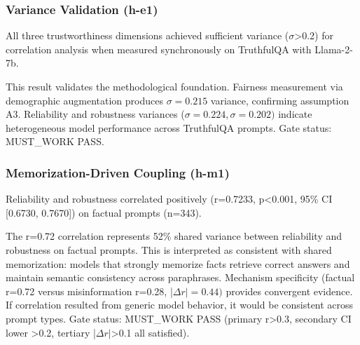
\subsubsection{Variance Validation (h-e1)}

All three trustworthiness dimensions achieved sufficient variance ($\sigma$>0.2) for correlation analysis when measured synchronously on TruthfulQA with Llama-2-7b.

\begin{table}[htbp]
\centering
{}
\end{table}

This result validates the methodological foundation. Fairness measurement via demographic augmentation produces $\sigma =0.215$ variance, confirming assumption A3. Reliability and robustness variances ($\sigma =0.224, \sigma =0.202)$ indicate heterogeneous model performance across TruthfulQA prompts. Gate status: MUST\_WORK PASS.

\subsubsection{Memorization-Driven Coupling (h-m1)}

Reliability and robustness correlated positively (r=0.7233, p<0.001, 95\% CI [0.6730, 0.7670]) on factual prompts (n=343).

\begin{table}[htbp]
\centering
{}
\end{table}

The r=0.72 correlation represents 52\% shared variance between reliability and robustness on factual prompts. This is interpreted as consistent with shared memorization: models that strongly memorize facts retrieve correct answers and maintain semantic consistency across paraphrases. Mechanism specificity (factual r=0.72 versus misinformation r=0.28, |$\Delta r|=0.44)$ provides convergent evidence. If correlation resulted from generic model behavior, it would be consistent across prompt types. Gate status: MUST\_WORK PASS (primary r>0.3, secondary CI lower >0.2, tertiary |$\Delta r|$>0.1 all satisfied).

